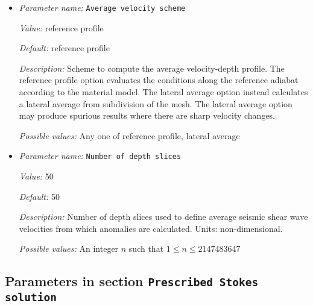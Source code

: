 \begin{itemize}
\item {\it Parameter name:} {\tt Average velocity scheme}
\label{parameters:Postprocess/Visualization/Vs anomaly/Average velocity scheme}
\label{parameters:Postprocess/Visualization/Vs_20anomaly/Average_20velocity_20scheme}


{\it Value:} reference profile


{\it Default:} reference profile


{\it Description:} Scheme to compute the average velocity-depth profile. The reference profile option evaluates the conditions along the reference adiabat according to the material model. The lateral average option instead calculates a lateral average from subdivision of the mesh. The lateral average option may produce spurious results where there are sharp velocity changes.


{\it Possible values:} Any one of reference profile, lateral average
\item {\it Parameter name:} {\tt Number of depth slices}
\label{parameters:Postprocess/Visualization/Vs anomaly/Number of depth slices}
\label{parameters:Postprocess/Visualization/Vs_20anomaly/Number_20of_20depth_20slices}


{\it Value:} 50


{\it Default:} 50


{\it Description:} Number of depth slices used to define average seismic shear wave velocities from which anomalies are calculated. Units: non-dimensional.


{\it Possible values:} An integer $n$ such that $1\leq n \leq 2147483647$
\end{itemize}

\subsection{Parameters in section \tt Prescribed Stokes solution}
\label{parameters:Prescribed_20Stokes_20solution}

